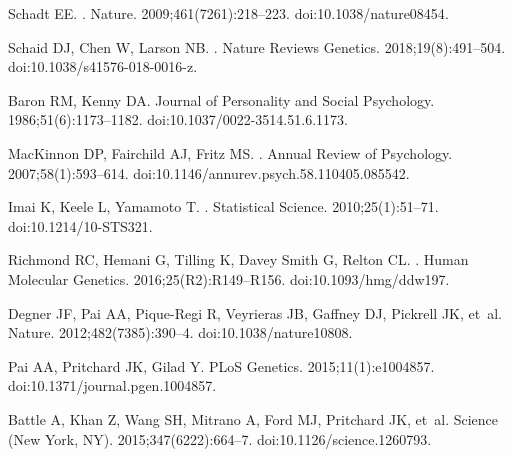 \documentclass[10pt,letterpaper]{article}
\begin{document}
\begin{thebibliography}{10}

Schadt EE.
.
\newblock Nature. 2009;461(7261):218--223.
\newblock doi:{10.1038/nature08454}.

Schaid DJ, Chen W, Larson NB.
.
\newblock Nature Reviews Genetics. 2018;19(8):491--504.
\newblock doi:{10.1038/s41576-018-0016-z}.

Baron RM, Kenny DA.
\newblock Journal of Personality and Social Psychology. 1986;51(6):1173--1182.
\newblock doi:{10.1037/0022-3514.51.6.1173}.

MacKinnon DP, Fairchild AJ, Fritz MS.
.
\newblock Annual Review of Psychology. 2007;58(1):593--614.
\newblock doi:{10.1146/annurev.psych.58.110405.085542}.

Imai K, Keele L, Yamamoto T.
.
\newblock Statistical Science. 2010;25(1):51--71.
\newblock doi:{10.1214/10-STS321}.

Richmond RC, Hemani G, Tilling K, {Davey Smith} G, Relton CL.
.
\newblock Human Molecular Genetics. 2016;25(R2):R149--R156.
\newblock doi:{10.1093/hmg/ddw197}.

Degner JF, Pai AA, Pique-Regi R, Veyrieras JB, Gaffney DJ, Pickrell JK, et~al.
\newblock Nature. 2012;482(7385):390--4.
\newblock doi:{10.1038/nature10808}.

Pai AA, Pritchard JK, Gilad Y.
\newblock PLoS Genetics. 2015;11(1):e1004857.
\newblock doi:{10.1371/journal.pgen.1004857}.

Battle A, Khan Z, Wang SH, Mitrano A, Ford MJ, Pritchard JK, et~al.
\newblock Science (New York, NY). 2015;347(6222):664--7.
\newblock doi:{10.1126/science.1260793}.


\end{thebibliography}
\end{document}
